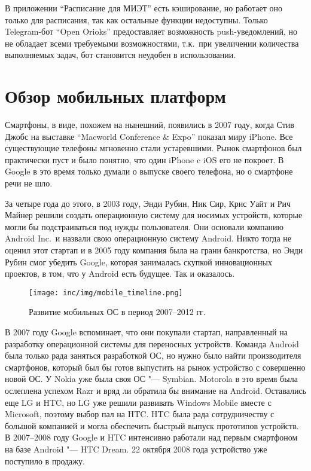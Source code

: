 В приложении ``Расписание для МИЭТ'' есть кэширование, но работает оно только для расписания, так как остальные функции недоступны.
Только Telegram-бот ``Open Orioks'' предоставляет возможность push-уведомлений, но не обладает всеми требуемыми возможностями, т.к.\ при увеличении количества выполняемых задач, бот становится неудобен в использовании.


\section{Обзор мобильных платформ}
\label{sec:platforms}
Смартфоны, в виде, похожем на нынешний, появились в 2007 году, когда Стив Джобс на выставке ``Macworld Conference \& Expo'' показал миру iPhone.
Все существующие телефоны мгновенно стали устаревшими.
Рынок смартфонов был практически пуст и было понятно, что один iPhone c iOS его не покроет.
В Google в это время только думали о выпуске своего телефона, но о смартфоне речи не шло.

За четыре года до этого, в 2003 году, Энди Рубин, Ник Сир, Крис Уайт и Рич Майнер решили создать операционную систему для носимых устройств, которые могли бы подстраиваться под нужды пользователя.
Они основали компанию Android Inc.\ и назвали свою операционную систему Android.
Никто тогда не оценил этот стартап и в 2005 году компания была на грани банкротства, но Энди Рубин смог убедить Google, которая занималась скупкой инновационных проектов, в том, что у Android есть будущее.
Так и оказалось.

\begin{figure}[ht]
  \centering
  \texttt{[image: inc/img/mobile\_timeline.png]}
  \caption{Развитие мобильных ОС в период 2007--2012 гг.}
  \label{fig:mobileTimeline}
\end{figure}

В 2007 году Google вспоминает, что они покупали стартап, направленный на разработку операционной системы для переносных устройств.
Команда Android была только рада заняться разработкой ОС, но нужно было найти производителя смартфонов, который был бы готов выпустить на рынок устройство с совершенно новой ОС.
У Nokia уже была своя ОС "--- Symbian.
Motorola в это время была ослеплена успехом Razr и вряд ли обратила бы внимание на Android.
Оставались еще LG и HTC, но LG уже решили развивать Windows Mobile вместе с Microsoft, поэтому выбор пал на HTC\@.
HTC была рада сотрудничеству с большой компанией и могла обеспечить быстрый выпуск прототипов устройств.
В 2007--2008 году Google и HTC интенсивно работали над первым смартфоном на базе Android "--- HTC Dream.
22 октября 2008 года устройство уже поступило в продажу.

